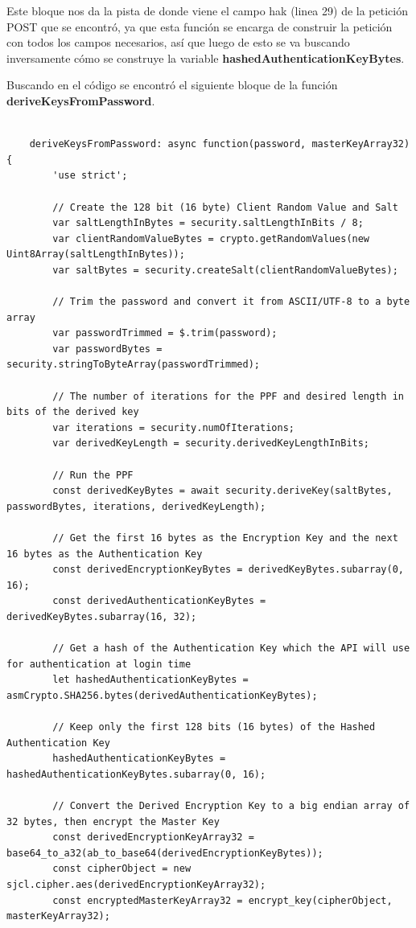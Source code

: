 \documentclass[letter,12pt]{article}
\begin{document}
Este bloque nos da la pista de donde viene el campo hak (linea 29) de la petición POST que se encontró, ya que esta función se encarga de construir la petición con todos los campos necesarios, así que luego de esto se va buscando inversamente cómo se construye la variable \textbf{hashedAuthenticationKeyBytes}.

Buscando en el código se encontró el siguiente bloque de la función \textbf{deriveKeysFromPassword}.

\begin{verbatim}

    deriveKeysFromPassword: async function(password, masterKeyArray32) {
        'use strict';

        // Create the 128 bit (16 byte) Client Random Value and Salt
        var saltLengthInBytes = security.saltLengthInBits / 8;
        var clientRandomValueBytes = crypto.getRandomValues(new Uint8Array(saltLengthInBytes));
        var saltBytes = security.createSalt(clientRandomValueBytes);

        // Trim the password and convert it from ASCII/UTF-8 to a byte array
        var passwordTrimmed = $.trim(password);
        var passwordBytes = security.stringToByteArray(passwordTrimmed);

        // The number of iterations for the PPF and desired length in bits of the derived key
        var iterations = security.numOfIterations;
        var derivedKeyLength = security.derivedKeyLengthInBits;

        // Run the PPF
        const derivedKeyBytes = await security.deriveKey(saltBytes, passwordBytes, iterations, derivedKeyLength);

        // Get the first 16 bytes as the Encryption Key and the next 16 bytes as the Authentication Key
        const derivedEncryptionKeyBytes = derivedKeyBytes.subarray(0, 16);
        const derivedAuthenticationKeyBytes = derivedKeyBytes.subarray(16, 32);

        // Get a hash of the Authentication Key which the API will use for authentication at login time
        let hashedAuthenticationKeyBytes = asmCrypto.SHA256.bytes(derivedAuthenticationKeyBytes);

        // Keep only the first 128 bits (16 bytes) of the Hashed Authentication Key
        hashedAuthenticationKeyBytes = hashedAuthenticationKeyBytes.subarray(0, 16);

        // Convert the Derived Encryption Key to a big endian array of 32 bytes, then encrypt the Master Key
        const derivedEncryptionKeyArray32 = base64_to_a32(ab_to_base64(derivedEncryptionKeyBytes));
        const cipherObject = new sjcl.cipher.aes(derivedEncryptionKeyArray32);
        const encryptedMasterKeyArray32 = encrypt_key(cipherObject, masterKeyArray32);


\end{verbatim}
\end{document}
